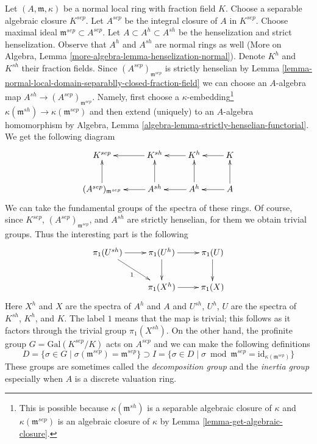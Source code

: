 \medskip\noindent
Let $(A, \mathfrak m, \kappa)$ be a normal local ring with
fraction field $K$. Choose a separable algebraic closure $K^{sep}$. Let
$A^{sep}$ be the integral closure of $A$ in $K^{sep}$.
Choose maximal ideal $\mathfrak m^{sep} \subset A^{sep}$.
Let $A \subset A^h \subset A^{sh}$ be the henselization and strict
henselization. Observe that $A^h$ and $A^{sh}$ are normal rings as well
(More on Algebra, Lemma \ref{more-algebra-lemma-henselization-normal}).
Denote $K^h$ and $K^{sh}$ their fraction fields.
Since $(A^{sep})_{\mathfrak m^{sep}}$ is strictly henselian by
Lemma \ref{lemma-normal-local-domain-separablly-closed-fraction-field}
we can choose an $A$-algebra map $A^{sh} \to (A^{sep})_{\mathfrak m^{sep}}$.
Namely, first choose a $\kappa$-embedding\footnote{This is possible
because $\kappa(\mathfrak m^{sh})$ is a separable algebraic closure
of $\kappa$ and $\kappa(\mathfrak m^{sep})$ is an algebraic closure
of $\kappa$ by Lemma \ref{lemma-get-algebraic-closure}.}
$\kappa(\mathfrak m^{sh}) \to \kappa(\mathfrak m^{sep})$ and
then extend (uniquely) to an $A$-algebra homomorphism by
Algebra, Lemma \ref{algebra-lemma-strictly-henselian-functorial}.
We get the following diagram
$$
\xymatrix{
K^{sep} & K^{sh} \ar[l] & K^h \ar[l] & K \ar[l] \\
(A^{sep})_{\mathfrak m^{sep}} \ar[u] &
A^{sh} \ar[u] \ar[l] &
A^h \ar[u] \ar[l] &
A \ar[u] \ar[l]
}
$$
We can take the fundamental groups of the spectra of these rings.
Of course, since $K^{sep}$, $(A^{sep})_{\mathfrak m^{sep}}$, and
$A^{sh}$ are strictly henselian, for them we obtain trivial groups.
Thus the interesting part is the following
\begin{equation}
\label{equation-inertia-diagram-pione}
\vcenter{
\xymatrix{
\pi_1(U^{sh}) \ar[r] \ar[rd]_1 & \pi_1(U^h) \ar[d] \ar[r] & \pi_1(U) \ar[d] \\
& \pi_1(X^h) \ar[r] & \pi_1(X)
}
}
\end{equation}
Here $X^h$ and $X$ are the spectra of $A^h$ and $A$ and
$U^{sh}$, $U^h$, $U$ are the spectra of $K^{sh}$, $K^h$, and $K$.
The label $1$ means that the map is trivial; this follows
as it factors through the trivial group $\pi_1(X^{sh})$.
On the other hand, the profinite group $G = \text{Gal}(K^{sep}/K)$
acts on $A^{sep}$ and we can make the following definitions
$$
D = \{\sigma \in G \mid \sigma(\mathfrak m^{sep}) = \mathfrak m^{sep}\}
\supset
I = \{\sigma \in D \mid \sigma \bmod \mathfrak m^{sep} =
\text{id}_{\kappa(\mathfrak m^{sep})}\}
$$
These groups are sometimes called the
{\it decomposition group} and the {\it inertia group}
especially when $A$ is a discrete valuation ring.

